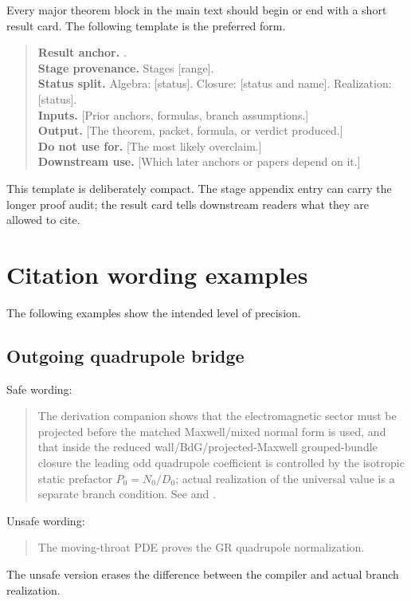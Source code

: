 Every major theorem block in the main text should begin or end with a short result card.  The following template is the preferred form.

\begin{quote}
\textbf{Result anchor.}  .\\
\textbf{Stage provenance.}  Stages [range].\\
\textbf{Status split.}  Algebra: [status].  Closure: [status and name].  Realization: [status].\\
\textbf{Inputs.}  [Prior anchors, formulas, branch assumptions.]\\
\textbf{Output.}  [The theorem, packet, formula, or verdict produced.]\\
\textbf{Do not use for.}  [The most likely overclaim.]\\
\textbf{Downstream use.}  [Which later anchors or papers depend on it.]
\end{quote}

This template is deliberately compact.  The stage appendix entry can carry the longer proof audit; the result card tells downstream readers what they are allowed to cite.

\section{Citation wording examples}
\label{sec:anchor-citation-wording-examples}

The following examples show the intended level of precision.

\subsection{Outgoing quadrupole bridge}
\label{subsec:citation-wording-outgoing-bridge}

Safe wording:
\begin{quote}
The derivation companion shows that the electromagnetic sector must be projected before the matched Maxwell/mixed normal form is used, and that inside the reduced wall/BdG/projected-Maxwell grouped-bundle closure the leading odd quadrupole coefficient is controlled by the isotropic static prefactor \(P_0=N_0/D_0\); actual realization of the universal value is a separate branch condition.  See  and .
\end{quote}

Unsafe wording:
\begin{quote}
The moving-throat PDE proves the GR quadrupole normalization.
\end{quote}
The unsafe version erases the difference between the compiler and actual branch realization.

